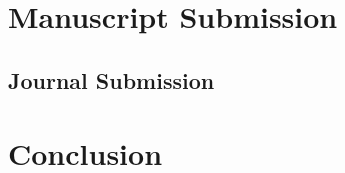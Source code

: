 \documentclass[letterpaper, preprint, paper,11pt]{AAS}	%
\begin{document}
%




\section{Manuscript Submission}

\subsection{Journal Submission}


\section{Conclusion}
%
\end{document}
